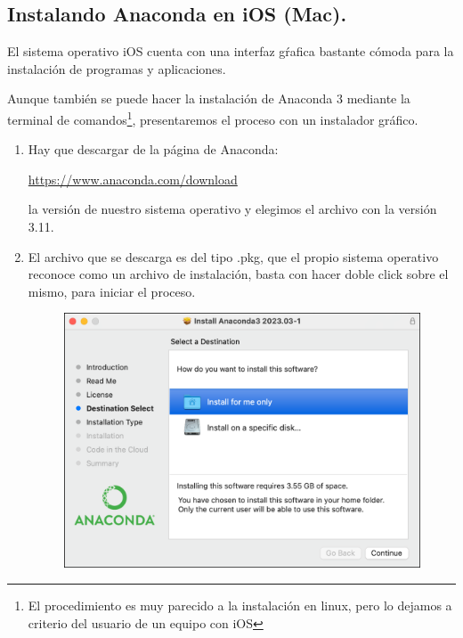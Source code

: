 \documentclass[12pt]{article}
\begin{document}
\subsection{Instalando Anaconda en iOS (Mac).}

El sistema operativo iOS cuenta con una interfaz gŕafica bastante cómoda para la instalación de programas y aplicaciones.
\par
Aunque también se puede hacer la instalación de Anaconda 3 mediante la terminal de comandos\footnote{El procedimiento es muy parecido a la instalación en linux, pero lo dejamos a criterio del usuario de un equipo con iOS}, presentaremos el proceso con un instalador gráfico.
\begin{enumerate}
\item Hay que descargar de la página de Anaconda:

 \url{https://www.anaconda.com/download}
 
 la versión de nuestro sistema operativo y elegimos el archivo con la versión 3.11.
\item El archivo que se descarga es del tipo .pkg, que el propio sistema operativo reconoce como un archivo de instalación, basta con hacer doble click sobre el mismo, para iniciar el proceso.
\begin{figure}[H]
	\centering
	\includegraphics[scale=0.5]{Imagenes/Nueva_Instalacion__Mac_01.png} 
\end{figure}


\end{enumerate}
\end{document}
